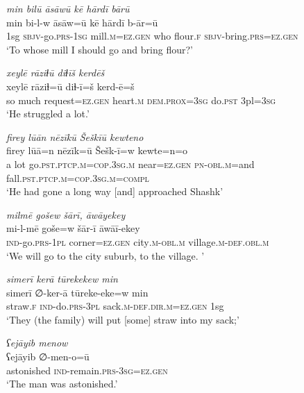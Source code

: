 \ea \label{HB.21}
\textit{min bilū āsāwū kē hārdī bārū} \\ 
\gll min bi-l-w āsāw=ū kē hārdī b-ār=ū \\ 
 1sg \textsc{sbjv-}go\textsc{.prs}\textsc{-1sg} mill\textsc{.m}\textsc{=ez}\textsc{.gen} who flour\textsc{\textsc{.f}} \textsc{sbjv-}bring\textsc{.prs}\textsc{=ez}\textsc{.gen} \\ 
\glt `To whose mill I should go and bring flour?'
\z 
 
\ea \label{HB.28}
\textit{xeylē rāziɫū diɫīš kerdēš} \\ 
\gll xeylē rāziɫ=ū diɫ-ī=š kerd-ē=š \\ 
 so much request\textsc{=ez}\textsc{.gen} heart\textsc{.m} \textsc{dem.prox}\textsc{=3sg} do\textsc{.pst} 3pl\textsc{=3sg} \\ 
\glt `He struggled a lot.'
\z 
 
\ea \label{HB.30}
\textit{firey lūān nēzīkū Šeškīū kewteno} \\ 
\gll firey lūā=n nēzīk=ū Šešk-ī=w kewte=n=o \\ 
 a lot go\textsc{.pst}\textsc{.ptcp}\textsc{.m}\textsc{=cop}\textsc{.3sg}\textsc{.m} near\textsc{=ez}\textsc{.gen} \textsc{pn}\textsc{-obl}\textsc{.m}=and fall\textsc{.pst}\textsc{.ptcp}\textsc{.m}\textsc{=cop}\textsc{.3sg}\textsc{.m}\textsc{=\textsc{compl}} \\ 
\glt `He had gone a long way [and] approached Shashk'
\z 
 
\ea \label{HB.33}
\textit{milmē gošew šārī, āwāyekey} \\ 
\gll mi-l-mē goše=w šār-ī āwāī-ekey \\ 
 \textsc{ind-}go\textsc{.prs}\textsc{-1pl} corner\textsc{=ez}\textsc{.gen} city\textsc{.m}\textsc{-obl}\textsc{.m} village\textsc{.m}\textsc{-def}\textsc{.obl}\textsc{.m} \\ 
\glt `We will go to the city suburb, to the village. '
\z 
 
\ea \label{HB.36}
\textit{simerī kerā tūrekekew min} \\ 
\gll simerī ∅-ker-ā tūreke-eke=w min \\ 
 straw\textsc{\textsc{.f}} \textsc{ind-}do\textsc{.prs}\textsc{-3pl} sack\textsc{.m}\textsc{-def}\textsc{.dir}\textsc{.m}\textsc{=ez}\textsc{.gen} 1sg \\ 
\glt `They (the family) will put [some] straw into my sack;'
\z 
 
\ea \label{HB.47}
\textit{ʕejāyib menow} \\ 
\gll ʕejāyib ∅-men-o=ū \\ 
 astonished \textsc{ind-}remain\textsc{.prs}\textsc{-3sg}\textsc{=ez}\textsc{.gen} \\ 
\glt `The man was astonished.'
\z 
 
